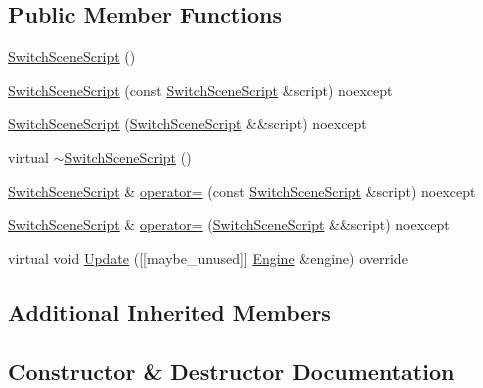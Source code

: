 \subsection*{Public Member Functions}
\begin{DoxyCompactItemize}
\item 
\hyperlink{classmage_1_1script_1_1_switch_scene_script_a7905bc08a81fbf2680e1b9e88a94988d}{Switch\+Scene\+Script} ()
\item 
\hyperlink{classmage_1_1script_1_1_switch_scene_script_af895d885db98e4b3ab7d3faca8fc8d8f}{Switch\+Scene\+Script} (const \hyperlink{classmage_1_1script_1_1_switch_scene_script}{Switch\+Scene\+Script} \&script) noexcept
\item 
\hyperlink{classmage_1_1script_1_1_switch_scene_script_af48c004b9419d4e462b6820297ebebd8}{Switch\+Scene\+Script} (\hyperlink{classmage_1_1script_1_1_switch_scene_script}{Switch\+Scene\+Script} \&\&script) noexcept
\item 
virtual \hyperlink{classmage_1_1script_1_1_switch_scene_script_ae4a846ba55d7b0ddb3730997ae162ba3}{$\sim$\+Switch\+Scene\+Script} ()
\item 
\hyperlink{classmage_1_1script_1_1_switch_scene_script}{Switch\+Scene\+Script} \& \hyperlink{classmage_1_1script_1_1_switch_scene_script_afb9ad12163066a2d801e0fdd0065303f}{operator=} (const \hyperlink{classmage_1_1script_1_1_switch_scene_script}{Switch\+Scene\+Script} \&script) noexcept
\item 
\hyperlink{classmage_1_1script_1_1_switch_scene_script}{Switch\+Scene\+Script} \& \hyperlink{classmage_1_1script_1_1_switch_scene_script_a59d77732c9ab91807f30af81accda316}{operator=} (\hyperlink{classmage_1_1script_1_1_switch_scene_script}{Switch\+Scene\+Script} \&\&script) noexcept
\item 
virtual void \hyperlink{classmage_1_1script_1_1_switch_scene_script_a04b60ff2b34f490012e4115ae1e788d7}{Update} (\mbox{[}\mbox{[}maybe\+\_\+unused\mbox{]}\mbox{]} \hyperlink{classmage_1_1_engine}{Engine} \&engine) override
\end{DoxyCompactItemize}
\subsection*{Additional Inherited Members}


\subsection{Constructor \& Destructor Documentation}
\hypertarget{classmage_1_1script_1_1_switch_scene_script_a7905bc08a81fbf2680e1b9e88a94988d}{}\label{classmage_1_1script_1_1_switch_scene_script_a7905bc08a81fbf2680e1b9e88a94988d} 
